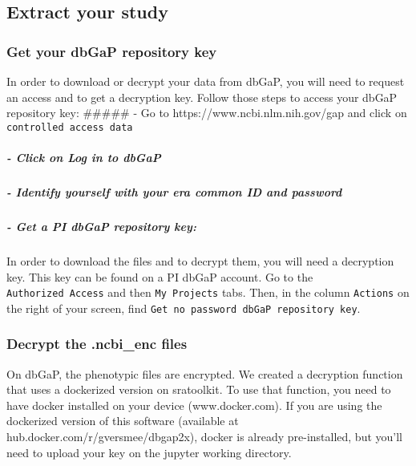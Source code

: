 \documentclass[11pt]{article}
\begin{document}
    
    \hypertarget{extract-your-study}{%
\subsection{Extract your study}\label{extract-your-study}}

\hypertarget{get-your-dbgap-repository-key}{%
\subsubsection{Get your dbGaP repository
key}\label{get-your-dbgap-repository-key}}

In order to download or decrypt your data from dbGaP, you will need to
request an access and to get a decryption key. Follow those steps to
access your dbGaP repository key: \#\#\#\#\# - Go to
https://www.ncbi.nlm.nih.gov/gap and click on
\texttt{controlled\ access\ data}

\hypertarget{click-on-log-in-to-dbgap}{%
\subparagraph{- Click on Log in to
dbGaP}\label{click-on-log-in-to-dbgap}}

\hypertarget{identify-yourself-with-your-era-common-id-and-password}{%
\subparagraph{- Identify yourself with your era common ID and
password}\label{identify-yourself-with-your-era-common-id-and-password}}

\hypertarget{get-a-pi-dbgap-repository-key}{%
\subparagraph{- Get a PI dbGaP repository
key:}\label{get-a-pi-dbgap-repository-key}}

In order to download the files and to decrypt them, you will need a
decryption key. This key can be found on a PI dbGaP account. Go to the
\texttt{Authorized\ Access} and then \texttt{My\ Projects} tabs. Then,
in the column \texttt{Actions} on the right of your screen, find
\texttt{Get\ no\ password\ dbGaP\ repository\ key}.

\hypertarget{decrypt-the-.ncbi_enc-files}{%
\subsubsection{Decrypt the .ncbi\_enc
files}\label{decrypt-the-.ncbi_enc-files}}

On dbGaP, the phenotypic files are encrypted. We created a decryption
function that uses a dockerized version on sratoolkit. To use that
function, you need to have docker installed on your device
(www.docker.com). If you are using the dockerized version of this
software (available at hub.docker.com/r/gversmee/dbgap2x), docker is
already pre-installed, but you'll need to upload your key on the jupyter
working directory.
\end{document}
